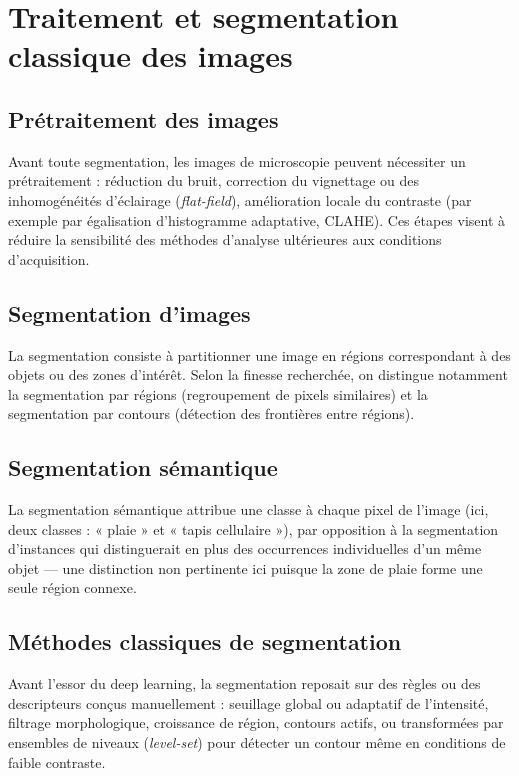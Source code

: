 \documentclass[12pt,a4paper]{report}
\begin{document}
\section{Traitement et segmentation classique des images}

\subsection{Prétraitement des images}

Avant toute segmentation, les images de microscopie peuvent nécessiter un prétraitement : réduction du bruit, correction du vignettage ou des inhomogénéités d'éclairage (\textit{flat-field}), amélioration locale du contraste (par exemple par égalisation d'histogramme adaptative, CLAHE). Ces étapes visent à réduire la sensibilité des méthodes d'analyse ultérieures aux conditions d'acquisition.

\subsection{Segmentation d'images}

La segmentation consiste à partitionner une image en régions correspondant à des objets ou des zones d'intérêt. Selon la finesse recherchée, on distingue notamment la segmentation par régions (regroupement de pixels similaires) et la segmentation par contours (détection des frontières entre régions).

\subsection{Segmentation sémantique}

La segmentation sémantique attribue une classe à chaque pixel de l'image (ici, deux classes : « plaie » et « tapis cellulaire »), par opposition à la segmentation d'instances qui distinguerait en plus des occurrences individuelles d'un même objet — une distinction non pertinente ici puisque la zone de plaie forme une seule région connexe.

\subsection{Méthodes classiques de segmentation}

Avant l'essor du deep learning, la segmentation reposait sur des règles ou des descripteurs conçus manuellement : seuillage global ou adaptatif de l'intensité, filtrage morphologique, croissance de région, contours actifs, ou transformées par ensembles de niveaux (\textit{level-set}) pour détecter un contour même en conditions de faible contraste.
\end{document}
